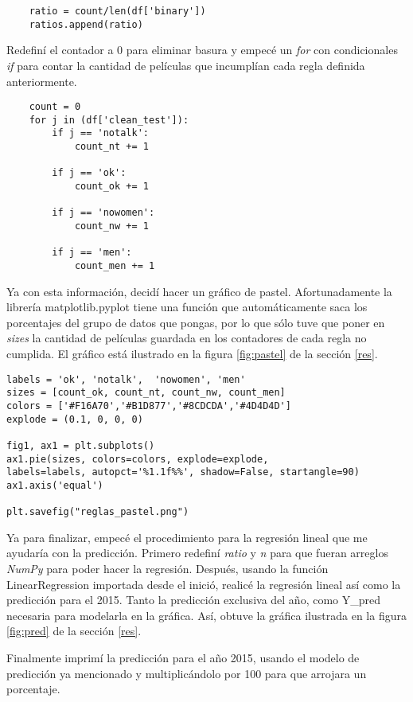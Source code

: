 \documentclass{article}
\begin{document}
\begin{lstlisting}        
    ratio = count/len(df['binary'])
    ratios.append(ratio)
\end{lstlisting}    
Redefiní el contador a 0 para eliminar basura y empecé un \textit{for} con condicionales \textit{if} para contar la cantidad de películas que incumplían cada regla definida anteriormente. 
\begin{lstlisting}
    count = 0
    for j in (df['clean_test']):
        if j == 'notalk':
            count_nt += 1
    
        if j == 'ok':
            count_ok += 1
    
        if j == 'nowomen':
            count_nw += 1
            
        if j == 'men':
            count_men += 1
\end{lstlisting}

Ya con esta información, decidí hacer un gráfico de pastel. Afortunadamente la librería matplotlib.pyplot tiene una función que automáticamente saca los porcentajes del grupo de datos que pongas, por lo que sólo tuve que poner en \textit{sizes} la cantidad de películas guardada en los contadores de cada regla no cumplida. El gráfico está ilustrado en la figura \ref{fig:pastel} de la sección \ref{res}.

\begin{lstlisting}
labels = 'ok', 'notalk',  'nowomen', 'men'
sizes = [count_ok, count_nt, count_nw, count_men]
colors = ['#F16A70','#B1D877','#8CDCDA','#4D4D4D']
explode = (0.1, 0, 0, 0)  

fig1, ax1 = plt.subplots()
ax1.pie(sizes, colors=colors, explode=explode,
labels=labels, autopct='%1.1f%%', shadow=False, startangle=90)
ax1.axis('equal')  

plt.savefig("reglas_pastel.png")
\end{lstlisting}

Ya para finalizar, empecé el procedimiento para la regresión lineal que me ayudaría con la predicción. Primero redefiní \textit{ratio} y \textit{n} para que fueran arreglos \textit{NumPy} para poder hacer la regresión. Después, usando la función LinearRegression importada desde el inició, realicé la regresión lineal así como la predicción para el 2015. Tanto la predicción exclusiva del año, como Y\_pred necesaria para modelarla en la gráfica. Así, obtuve la gráfica ilustrada en la figura \ref{fig:pred} de la sección \ref{res}.

Finalmente imprimí la predicción para el año 2015, usando el modelo de predicción ya mencionado y multiplicándolo por 100 para que arrojara un porcentaje.
\end{document}
